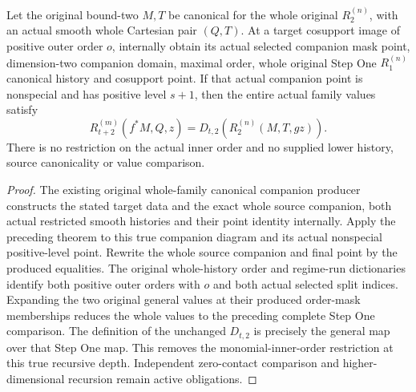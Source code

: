 \begin{theorem}
\label{hir:smooth-original-positive-curve-general-value}
\leanok
{}
Let the original bound-two $M,T$ be canonical for the whole original
$R^{(n)}_2$, with an actual smooth whole Cartesian pair $(Q,T)$. At a
target cosupport image of positive outer order $o$, internally obtain
its actual selected companion mask point, dimension-two companion domain,
maximal order, whole original Step One $R^{(n)}_1$ canonical history and
cosupport point. If that actual companion point is nonspecial and has
positive level $s+1$, then the entire actual family values satisfy
\[R^{(m)}_{t+2}(f^*M,Q,z)=D_{t,2}(R^{(n)}_2(M,T,gz)).\]
There is no restriction on the actual inner order and no supplied lower
history, source canonicality or value comparison.
\end{theorem}
\begin{proof}
The existing original whole-family canonical companion producer constructs
the stated target data and the exact whole source companion, both actual
restricted smooth histories and their point identity internally. Apply
the preceding theorem to this true companion diagram and its actual
nonspecial positive-level point. Rewrite the whole source companion and
final point by the produced equalities. The original whole-history order
and regime-run dictionaries identify both positive outer orders with $o$
and both actual selected split indices. Expanding the two original general
values at their produced order-mask memberships reduces the whole values
to the preceding complete Step One comparison. The definition of the
unchanged $D_{t,2}$ is precisely the general map over that Step One map.
This removes the monomial-inner-order restriction at this true recursive
depth. Independent zero-contact comparison and higher-dimensional
recursion remain active obligations.
\end{proof}
